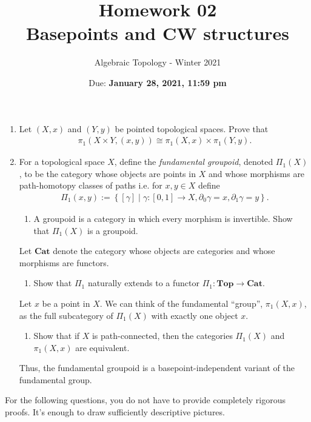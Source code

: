 \documentclass{article}
\title{Homework 02 \\ Basepoints and CW structures}
\author{Algebraic Topology - Winter 2021}
\date{Due: \textbf{January 28, 2021, 11:59 pm}}
\begin{document}
\maketitle

\begin{enumerate}
    \item Let $(X,x)$ and $(Y,y)$ be pointed topological spaces. Prove that 
        \begin{align*}
            \pi_1(X \times Y, (x,y)) \cong \pi_1(X,x) \times \pi_1(Y,y).
        \end{align*}
        
    \item  For a topological space $X$, define the \emph{fundamental groupoid}, denoted $\Pi_1(X)$, to be the category whose objects are points in $X$ and whose morphisms are path-homotopy classes of paths i.e. for $x,y \in X$ define
    \begin{align*}
        \Pi_1(x,y) := \left\{ [\gamma] \mid \gamma: [0,1] \to X, \partial_0 \gamma = x, \partial_1 \gamma = y \right\}.
    \end{align*}
    \begin{enumerate}
        \item A groupoid is a category in which every morphism is invertible. 
        Show that $\Pi_1(X)$ is a groupoid.
    \end{enumerate}
    Let $\mathbf{Cat}$ denote the category whose objects are categories and whose morphisms are functors. 
    \begin{enumerate}[resume]
        \item Show that $\Pi_1$ naturally extends to a functor $\Pi_1: \mathbf{Top} \to \mathbf{Cat}$.
    \end{enumerate}
    Let $x$ be a point in $X$. We can think of the fundamental ``group'', $\pi_1(X,x)$, as the full subcategory of $\Pi_1(X)$ with exactly one object $x$.
    \begin{enumerate}[resume]
        \item Show that if $X$ is path-connected, then the categories $\Pi_1(X)$ and $\pi_1(X,x)$ are equivalent.
    \end{enumerate}
    Thus, the fundamental groupoid is a basepoint-independent variant of the fundamental group. 
\end{enumerate}
For the following questions, you do not have to provide completely rigorous proofs. It's enough to draw sufficiently descriptive pictures.
\end{document}
